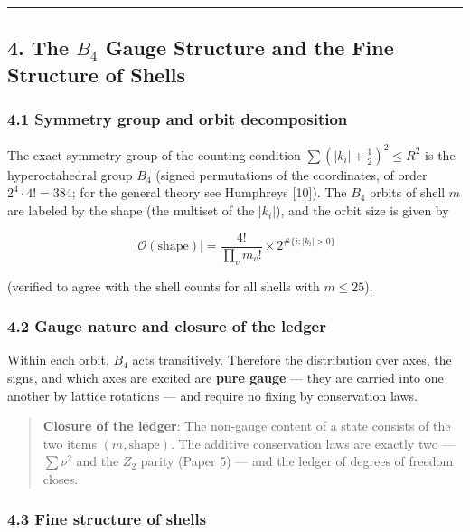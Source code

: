 \documentclass[
]{article}
\begin{document}
\begin{center}\rule{0.5\linewidth}{0.5pt}\end{center}

\subsection{\texorpdfstring{4. The \(B_4\) Gauge Structure and the Fine
Structure of
Shells}{4. The B\_4 Gauge Structure and the Fine Structure of Shells}}\label{the-b_4-gauge-structure-and-the-fine-structure-of-shells}

\subsubsection{4.1 Symmetry group and orbit
decomposition}\label{symmetry-group-and-orbit-decomposition}

The exact symmetry group of the counting condition
\(\sum(|k_i|+\tfrac12)^2\le R^2\) is the hyperoctahedral group \(B_4\)
(signed permutations of the coordinates, of order \(2^4\cdot4!=384\);
for the general theory see Humphreys {[}10{]}). The \(B_4\) orbits of
shell \(m\) are labeled by the shape (the multiset of the \(|k_i|\)),
and the orbit size is given by

\[
|\mathcal{O}(\text{shape})|=\frac{4!}{\prod_v m_v!}\times 2^{\#\{i:|k_i|>0\}}
\]

(verified to agree with the shell counts for all shells with
\(m\le25\)).

\subsubsection{4.2 Gauge nature and closure of the
ledger}\label{gauge-nature-and-closure-of-the-ledger}

Within each orbit, \(B_4\) acts transitively. Therefore the distribution
over axes, the signs, and which axes are excited are \textbf{pure gauge}
--- they are carried into one another by lattice rotations --- and
require no fixing by conservation laws.

\begin{quote}
\textbf{Closure of the ledger}: The non-gauge content of a state
consists of the two items \((m,\text{shape})\). The additive
conservation laws are exactly two --- \(\sum\nu^2\) and the \(Z_2\)
parity (Paper 5) --- and the ledger of degrees of freedom closes.
\end{quote}

\subsubsection{4.3 Fine structure of
shells}\label{fine-structure-of-shells}
\end{document}
